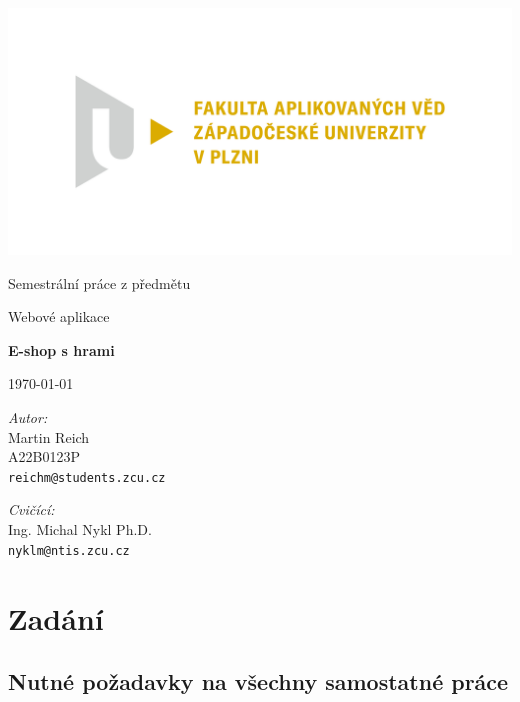 \documentclass[12pt, a4paper]{report}
\newcommand{\lawyertalk}{\tiny}
\begin{document}
\begin{titlepage}
    \centering      %
    \Large          %
    \sffamily       %

    \includegraphics[width=.7\textwidth]{fav}

    Semestrální práce z předmětu

    Webové aplikace
    
    \vspace{18mm}
    {\Huge\bfseries E-shop s hrami}

    \vspace{18mm}
    \today                          %

    \vfill                          %
    \raggedright                    %
    \textsl{\lawyertalk Autor:}\\   %
    Martin Reich\\               %
    A22B0123P\\
    \texttt{reichm@students.zcu.cz}
    
    \vspace{\baselineskip}
    \textsl{Cvičící:}\\
    Ing. Michal Nykl Ph.D.\\
    \texttt{nyklm@ntis.zcu.cz}
\end{titlepage}

\tableofcontents

\pagebreak

\section{Zadání}
\subsection{Nutné požadavky na všechny samostatné práce}
\end{document}
